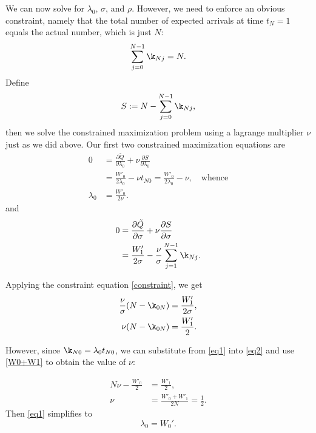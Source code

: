 \documentclass[12pt,leqno]{article}
\begin{document}
We can now solve for $\lambda_0$, $\sigma$, and $\rho$.  However, we
need to enforce an obvious constraint, namely that
the total number of expected arrivals at time $t_N = 1$ equals the
actual number, which is just $N$:
\begin{equation}\label{constraint}
  \sum_{j=0}^{N-1}\k_{Nj} = N.
\end{equation}
Define
$$
S := N - \sum_{j=0}^{N-1}\k_{Nj},
$$
then we solve the constrained maximization problem using a lagrange multiplier $\nu$ just as we did above.
Our first two constrained maximization equations are
\begin{equation}\label{eq1}
  \begin{split}
    0 &= \frac{\partial\tilde{Q}}{\partial\lambda_0} + \nu\frac{\partial{S}}{\partial\lambda_0} \\
    &=  \frac{W'_0}{2\lambda_0} - {\nu}t_{N0} = \frac{W'_0}{2\lambda_0} - {\nu},\quad\text{whence}\\
    \lambda_0 &= \frac{W'_0}{2\nu}.
  \end{split}
\end{equation}
and
\begin{equation}\label{eq2}
  \begin{split}
    0 &= \frac{\partial\tilde{Q}}{\partial\sigma} + \nu\frac{\partial{S}}{\partial\sigma} \\
    &= \frac{W'_1}{2\sigma}-
    \frac{\nu}{\sigma}\sum_{j=1}^{N-1}\k_{Nj}.
  \end{split}
\end{equation}

Applying the constraint equation \eqref{constraint}, we get
\begin{align*}
      \frac{\nu}{\sigma}(N-\k_{0N}) &= \frac{W'_1}{2\sigma},\\
      \nu(N-\k_{0N}) &= \frac{W'_1}{2}.
  \end{align*}

However, since $\k_{N0} = \lambda_0t_{N0}$, we can substitute
from \eqref{eq1} into \eqref{eq2} and use \eqref{W0+W1}
to obtain the value of $\nu$:

\begin{equation}\label{nu}
  \begin{split}
N\nu - \frac{W'_0}{2} &= \frac{W'_1}{2},\\ 
\nu &= \frac{W'_0+W'_1}{2N} = \frac{1}{2}.
  \end{split}
\end{equation}
Then \eqref{eq1} simplifies to
\begin{equation} \label{lambda0:1}
    \lambda_0 = W_0'.
\end{equation}
\end{document}
